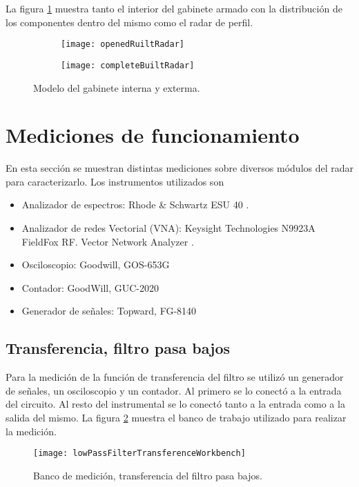 La figura \ref{fig:completeRadar} muestra tanto el interior del gabinete armado con la distribución de los componentes dentro del mismo como el radar de perfil.

\begin{figure}[H]
 \centering
 \begin{subfigure}[t]{0.8\textwidth}
    \texttt{[image: openedRuiltRadar]}
  \end{subfigure}

  \begin{subfigure}[t]{0.5\textwidth}
    \texttt{[image: completeBuiltRadar]}
  \end{subfigure}
 \caption{Modelo del gabinete interna y exterma.}
 \label{fig:completeRadar}
\end{figure}


\section{Mediciones de funcionamiento}

En esta sección se muestran distintas mediciones sobre diversos módulos del radar para caracterizarlo.
Los instrumentos utilizados son
\begin{itemize}
  \item Analizador de espectros: Rhode \& Schwartz ESU 40 \cite{spectrumAnalyzer}.
  \item Analizador de redes Vectorial (VNA): Keysight Technologies N9923A FieldFox RF.
Vector Network Analyzer \cite{VNA}.
  \item Osciloscopio: Goodwill, GOS-653G
  \item Contador: GoodWill, GUC-2020
  \item Generador de señales: Topward, FG-8140
\end{itemize}

\subsection{Transferencia, filtro pasa bajos}

Para la medición de la función de transferencia del filtro se utilizó un generador de señales, un osciloscopio y un contador. Al primero se lo conectó a la entrada del circuito. Al resto del instrumental se lo conectó tanto a la entrada como a la salida del mismo. La figura \ref{fig:lowPassFilterConnections} muestra el banco de trabajo utilizado para realizar la medición.

\begin{figure}[H]
 \centering
 \texttt{[image: lowPassFilterTransferenceWorkbench]}
 \caption{Banco de medición, transferencia del filtro pasa bajos.}
 \label{fig:lowPassFilterConnections}
\end{figure}

